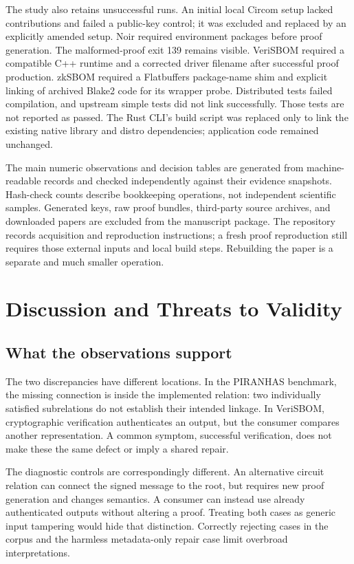 \documentclass[sigconf,nonacm]{acmart}
\begin{document}
The study also retains unsuccessful runs. An initial local Circom setup lacked contributions and failed a public-key control; it was excluded and replaced by an explicitly amended setup. Noir required environment packages before proof generation. The malformed-proof exit 139 remains visible. VeriSBOM required a compatible C++ runtime and a corrected driver filename after successful proof production. zkSBOM required a Flatbuffers package-name shim and explicit linking of archived Blake2 code for its wrapper probe. Distributed tests failed compilation, and upstream simple tests did not link successfully. Those tests are not reported as passed. The Rust CLI's build script was replaced only to link the existing native library and distro dependencies; application code remained unchanged.

The main numeric observations and decision tables are generated from machine-readable records and checked independently against their evidence snapshots. Hash-check counts describe bookkeeping operations, not independent scientific samples. Generated keys, raw proof bundles, third-party source archives, and downloaded papers are excluded from the manuscript package. The repository records acquisition and reproduction instructions; a fresh proof reproduction still requires those external inputs and local build steps. Rebuilding the paper is a separate and much smaller operation.

\section{Discussion and Threats to Validity}
\subsection{What the observations support}
The two discrepancies have different locations. In the PIRANHAS benchmark, the missing connection is inside the implemented relation: two individually satisfied subrelations do not establish their intended linkage. In VeriSBOM, cryptographic verification authenticates an output, but the consumer compares another representation. A common symptom, successful verification, does not make these the same defect or imply a shared repair.

The diagnostic controls are correspondingly different. An alternative circuit relation can connect the signed message to the root, but requires new proof generation and changes semantics. A consumer can instead use already authenticated outputs without altering a proof. Treating both cases as generic input tampering would hide that distinction. Correctly rejecting cases in the corpus and the harmless metadata-only repair case limit overbroad interpretations.
\end{document}
